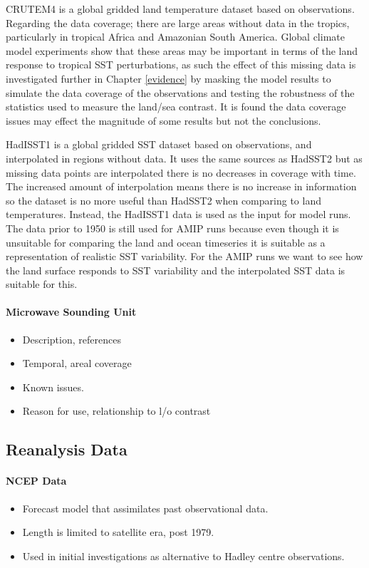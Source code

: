 CRUTEM4 is a global gridded land temperature dataset based on observations.  
Regarding the data coverage; there are large areas without data in the tropics, 
particularly in tropical Africa and Amazonian South America. Global climate 
model experiments show that these areas may be important in terms of the land 
response to tropical SST perturbations, as such the effect of this missing data 
is investigated further in Chapter \ref{evidence} by masking the model results 
to simulate the data coverage of the observations and testing the robustness of 
the statistics used to measure the land/sea contrast. It is found the data 
coverage issues may effect the magnitude of some results but not the 
conclusions.

HadISST1 is a global gridded SST dataset based on observations, and interpolated 
in regions without data. It uses the same sources as HadSST2 but as missing data 
points are interpolated there is no decreases in coverage with time. The 
increased amount of interpolation means there is no increase in information so 
the dataset is no more useful than HadSST2 when comparing to land temperatures.  
Instead, the HadISST1 data is used as the input for model runs. The data prior 
to 1950 is still used for AMIP runs because even though it is unsuitable for 
comparing the land and ocean timeseries	it is suitable as a representation of 
realistic SST variability. For the AMIP runs we want to see how the land surface 
responds to SST variability and the interpolated SST data is suitable for this.

\paragraph{Microwave Sounding Unit}
\begin{itemize}
	\item Description, references
	\item Temporal, areal coverage
	\item Known issues.
	\item Reason for use, relationship to l/o contrast
\end{itemize}


\subsection{Reanalysis Data}

\paragraph{NCEP Data}
\begin{itemize}
	\item Forecast model that assimilates past observational data.
	\item Length is limited to satellite era, post 1979.
	\item Used in initial investigations as alternative to Hadley centre 
		observations.
\end{itemize}


